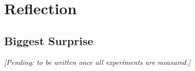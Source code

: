 \section{Reflection}

\subsection{Biggest Surprise}
\textit{[Pending: to be written once all experiments are measured.]}
